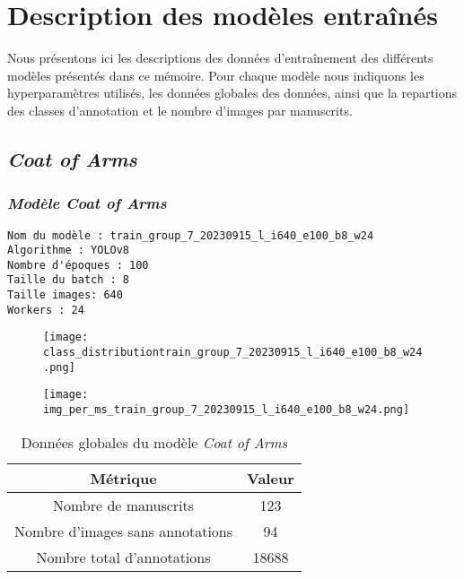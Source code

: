 \documentclass[12pt,twoside]{book}
\begin{document}
\cleardoublepage
{}
{}
\appendix

\chapter{Description des modèles entraînés}

Nous présentons ici les descriptions des données d'entraînement des différents modèles présentés dans ce mémoire. Pour chaque modèle nous indiquons les hyperparamètres utilisés, les données globales des données, ainsi que la repartions des classes d'annotation  et le nombre d'images par manuscrits.

\newpage

\section{\textit{Coat of Arms}}
\subsection{\textit{Modèle Coat of Arms}}

\begin{verbatim}
Nom du modèle : train_group_7_20230915_l_i640_e100_b8_w24
Algorithme : YOLOv8
Nombre d'époques : 100
Taille du batch : 8
Taille images: 640
Workers : 24
\end{verbatim}


\begin{figure}[ht]
    \centering
    \begin{minipage}[b]{0.45\textwidth}
        \centering
        \texttt{[image: class\_distributiontrain\_group\_7\_20230915\_l\_i640\_e100\_b8\_w24.png]}
    \end{minipage}
    \hfill
    \begin{minipage}[b]{0.45\textwidth}
        \centering
        \texttt{[image: img\_per\_ms\_train\_group\_7\_20230915\_l\_i640\_e100\_b8\_w24.png]}
    \end{minipage}
\end{figure}

\begin{center}
\begin{table}[ht]
    \centering
    \caption{Données globales du modèle \textit{Coat of Arms}}
    \begin{tabular}{|c|c|}
    \hline
    \textbf{Métrique} & \textbf{Valeur} \\
    \hline
    Nombre de manuscrits & 123 \\ 
    \hline
    Nombre d'images sans annotations & 94 \\ 
    \hline
    Nombre total d'annotations & 18688 \\ 
    \hline
    \end{tabular}
\end{table}    
\end{center}
\end{document}
